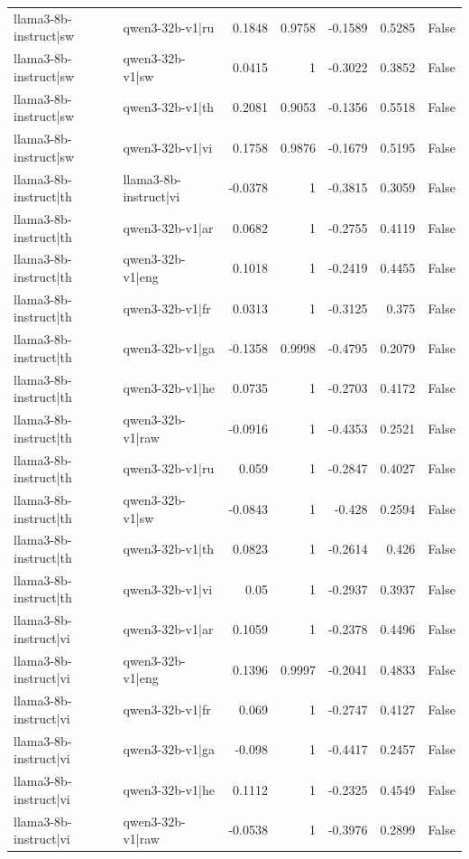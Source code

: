 \begin{table}
\begin{tabular}{l l r r r r l}
llama3-8b-instruct|sw & qwen3-32b-v1|ru & 0.1848 & 0.9758 & -0.1589 & 0.5285 & False \\
llama3-8b-instruct|sw & qwen3-32b-v1|sw & 0.0415 & 1 & -0.3022 & 0.3852 & False \\
llama3-8b-instruct|sw & qwen3-32b-v1|th & 0.2081 & 0.9053 & -0.1356 & 0.5518 & False \\
llama3-8b-instruct|sw & qwen3-32b-v1|vi & 0.1758 & 0.9876 & -0.1679 & 0.5195 & False \\
llama3-8b-instruct|th & llama3-8b-instruct|vi & -0.0378 & 1 & -0.3815 & 0.3059 & False \\
llama3-8b-instruct|th & qwen3-32b-v1|ar & 0.0682 & 1 & -0.2755 & 0.4119 & False \\
llama3-8b-instruct|th & qwen3-32b-v1|eng & 0.1018 & 1 & -0.2419 & 0.4455 & False \\
llama3-8b-instruct|th & qwen3-32b-v1|fr & 0.0313 & 1 & -0.3125 & 0.375 & False \\
llama3-8b-instruct|th & qwen3-32b-v1|ga & -0.1358 & 0.9998 & -0.4795 & 0.2079 & False \\
llama3-8b-instruct|th & qwen3-32b-v1|he & 0.0735 & 1 & -0.2703 & 0.4172 & False \\
llama3-8b-instruct|th & qwen3-32b-v1|raw & -0.0916 & 1 & -0.4353 & 0.2521 & False \\
llama3-8b-instruct|th & qwen3-32b-v1|ru & 0.059 & 1 & -0.2847 & 0.4027 & False \\
llama3-8b-instruct|th & qwen3-32b-v1|sw & -0.0843 & 1 & -0.428 & 0.2594 & False \\
llama3-8b-instruct|th & qwen3-32b-v1|th & 0.0823 & 1 & -0.2614 & 0.426 & False \\
llama3-8b-instruct|th & qwen3-32b-v1|vi & 0.05 & 1 & -0.2937 & 0.3937 & False \\
llama3-8b-instruct|vi & qwen3-32b-v1|ar & 0.1059 & 1 & -0.2378 & 0.4496 & False \\
llama3-8b-instruct|vi & qwen3-32b-v1|eng & 0.1396 & 0.9997 & -0.2041 & 0.4833 & False \\
llama3-8b-instruct|vi & qwen3-32b-v1|fr & 0.069 & 1 & -0.2747 & 0.4127 & False \\
llama3-8b-instruct|vi & qwen3-32b-v1|ga & -0.098 & 1 & -0.4417 & 0.2457 & False \\
llama3-8b-instruct|vi & qwen3-32b-v1|he & 0.1112 & 1 & -0.2325 & 0.4549 & False \\
llama3-8b-instruct|vi & qwen3-32b-v1|raw & -0.0538 & 1 & -0.3976 & 0.2899 & False \\

\end{tabular}
\end{table}
